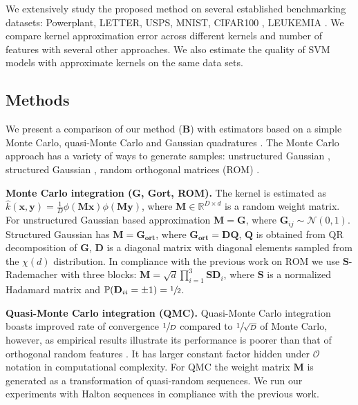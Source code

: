 We extensively study the proposed method on several established benchmarking datasets:
Powerplant, LETTER, USPS, MNIST, CIFAR100 \citep{krizhevsky2009learning},
LEUKEMIA \citep{golub1999molecular}.
We compare kernel approximation error across different kernels and number of features
with several other approaches.
We also estimate the quality of SVM models
with approximate kernels on the same data sets.%

\subsection{Methods}
\label{subsub:methods}
We present a comparison of our method ($\mathbf{B}$) with estimators based on a simple Monte
Carlo, quasi-Monte Carlo \citep{yang2014quasi} and
Gaussian quadratures \citep{dao2017gaussian}.
The Monte Carlo approach has a variety of ways to generate samples: unstructured Gaussian
\citep{rahimi2008random}, structured Gaussian \citep{felix2016orthogonal}, random orthogonal
matrices (ROM) \citep{choromanski2017unreasonable}.

\textbf{Monte Carlo integration (G, Gort, ROM).}
The kernel is estimated as
$\hat{k}(\mathbf{x},\mathbf{y}) = \frac{1}{D} \phi(\mathbf{Mx}) \phi(\mathbf{My})$,
where $\mathbf{M} \in \mathbb{R}^{D \times d}$ is a random weight matrix.
For unstructured Gaussian based approximation $\mathbf{M} = \mathbf{G}$,
where $\mathbf{G}_{ij} \sim \mathcal{N}(0,1)$.
Structured Gaussian has $\mathbf{M} = \mathbf{G_{\text{ort}}}$,
where $\mathbf{G_{\text{ort}}} = \mathbf{D}\mathbf{Q}$, $\mathbf{Q}$ is obtained from
QR decomposition of $\mathbf{G}$,
$\mathbf{D}$ is a diagonal matrix with diagonal elements sampled from the $\chi(d)$
distribution.
In compliance with the previous work on ROM we use $\mathbf{S}$-Rademacher with three blocks:
$\mathbf{M} = \sqrt{d}\prod\limits_{i=1}^{3} \mathbf{SD}_i$,
where $\mathbf{S}$ is a normalized Hadamard matrix and
$\mathbb{P}(\mathbf{D}_{ii} = \pm 1) = \sfrac{1}{2}$.

\textbf{Quasi-Monte Carlo integration (QMC).}
Quasi-Monte Carlo integration boasts improved rate of convergence $\sfrac{1}{D}$ compared to
$\sfrac{1}{\sqrt{D}}$ of Monte Carlo, however, as empirical results illustrate its performance
is poorer than that of orthogonal random features \citep{felix2016orthogonal}.
It has larger constant factor hidden under $\mathcal{O}$ notation in computational complexity.
For QMC the weight matrix $\mathbf{M}$ is generated as a transformation of quasi-random
sequences.
We run our experiments with Halton sequences in compliance with the previous work.

